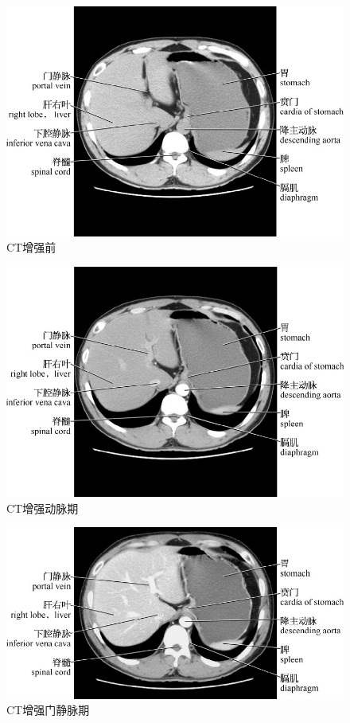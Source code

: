 \begin{figure}[!htbp]
 \centering
 \includegraphics{./images/Image00140.jpg}
 \captionsetup{justification=centering}
 \caption{CT增强前}
  \end{figure} 
 \FloatBarrier

\begin{figure}[!htbp]
 \centering
 \includegraphics{./images/Image00141.jpg}
 \captionsetup{justification=centering}
 \caption{CT增强动脉期}
  \end{figure} 
 \FloatBarrier

\begin{figure}[!htbp]
 \centering
 \includegraphics{./images/Image00142.jpg}
 \captionsetup{justification=centering}
 \caption{CT增强门静脉期}
  \end{figure} 
 \FloatBarrier

